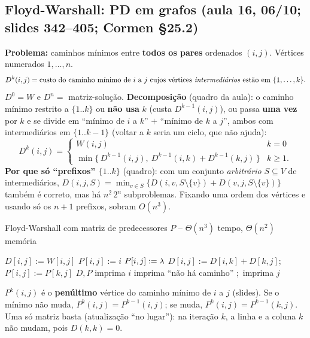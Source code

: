 \subsection{Floyd-Warshall: PD em grafos (aula 16, 06/10; slides 342--405; Cormen §25.2)}\label{sec:fw}
\textbf{Problema:} caminhos mínimos entre \textbf{todos os pares} ordenados $(i,j)$. Vértices numerados $1,\dots,n$.
\[
D^k(i,j)=\text{custo do caminho mínimo de }i\text{ a }j\text{ cujos vértices \emph{intermediários} estão em }\{1,\dots,k\}.
\]
$D^0=W$ e $D^n=$ matriz-solução. \textbf{Decomposição} (quadro da aula): o caminho mínimo restrito a $\{1..k\}$ ou \textbf{não usa} $k$ (custa $D^{k-1}(i,j)$), ou passa \textbf{uma vez} por $k$ e se divide em ``mínimo de $i$ a $k$'' $+$ ``mínimo de $k$ a $j$'', ambos com intermediários em $\{1..k-1\}$ (voltar a $k$ seria um ciclo, que não ajuda):
\[
D^k(i,j)=\begin{cases}W(i,j) & k=0\\ \min\{\,D^{k-1}(i,j),\ D^{k-1}(i,k)+D^{k-1}(k,j)\,\} & k\ge1.\end{cases}
\]
\textbf{Por que só ``prefixos'' $\{1..k\}$} (quadro): com um conjunto \emph{arbitrário} $S\subseteq V$ de intermediários, $D(i,j,S)=\min_{v\in S}\{D(i,v,S\setminus\{v\})+D(v,j,S\setminus\{v\})\}$ também é correto, mas há $n^2\,2^n$ subproblemas. Fixando uma ordem dos vértices e usando só os $n+1$ prefixos, sobram $O(n^3)$.

\begin{pseudo}{Floyd-Warshall com matriz de predecessores $P$ -- $\Theta(n^3)$ tempo, $\Theta(n^2)$ memória}
\begin{algorithmic}
    \State $D[i,j]:=W[i,j]$
     \State $P[i,j]:=i$ \Else \State $P[i,j]:=\lambda$ \EndIf
  \EndFor
   
          \State $D[i,j]:=D[i,k]+D[k,j]$;\ $P[i,j]:=P[k,j]$ 
        \EndIf
      \EndFor
    \EndFor
  \EndFor
  \State \Return $D,P$
\EndFunction
{}
   \State imprima $i$
   \State imprima ``não há caminho''
  \Else \State {};\ imprima $j$
  \EndIf
\EndProcedure
\end{algorithmic}
\end{pseudo}
$P^k(i,j)$ é o \textbf{penúltimo} vértice do caminho mínimo de $i$ a $j$ (slides). Se o mínimo não muda, $P^k(i,j)=P^{k-1}(i,j)$; se muda, $P^k(i,j)=P^{k-1}(k,j)$. Uma só matriz basta (atualização ``no lugar''): na iteração $k$, a linha e a coluna $k$ não mudam, pois $D(k,k)=0$.

